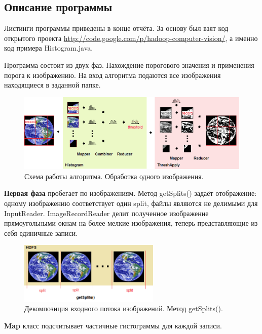 \documentclass[12pt,a4paper]{extarticle} %
\begin{document}
\subsection{Описание программы}
    Листинги программы приведены в конце отчёта. За основу был взят код открытого проекта \href{http://code.google.com/p/hadoop-computer-vision/}{http://code.google.com/p/hadoop-computer-vision/}, а именно код примера Histogram.java.

    Программа состоит из двух фаз. Нахождение порогового значения и применения порога к изображению. На вход алгоритма подаются все изображения находящиеся в заданной папке. 

	\begin{figure}[h]
		 \centering
		 \includegraphics[width=\textwidth]{images/mapreducejob.png}
		 \caption{Схема работы алгоритма. Обработка одного изображения.}
	\end{figure}

    \textbf{Первая фаза} пробегает по изображениям. Метод getSplits() задаёт отображение: одному изображению соответствует один split, файлы являются не делимыми для InputReader. ImageRecordReader делит полученное изображение прямоугольными окнам на более мелкие изображения, теперь представляющие из себя единичные записи.\\[5pt]

	\begin{figure}[h]
		 \centering
		 \includegraphics[width=0.6\textwidth]{images/getsplits.png}
		 \caption{Декомпозиция входного потока изображений. Метод getSplits().}
	\end{figure}

    \noindent \textbf{Map} класс подсчитывает частичные гистограммы для каждой записи. 
\end{document}
